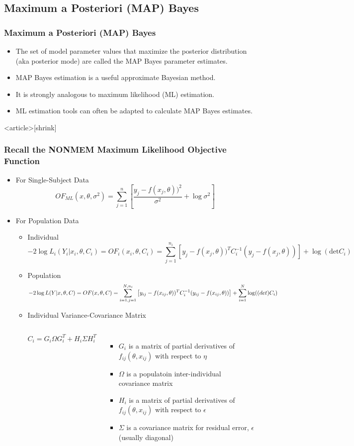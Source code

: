 \documentclass[handout]{beamer}
\begin{document}
\subsection{Maximum a Posteriori (MAP) Bayes}

\begin{frame}
  \frametitle{Maximum a Posteriori (MAP) Bayes}

  \begin{itemize}
  \item The set of model parameter values that maximize the posterior
    distribution (aka posterior mode) are called the MAP Bayes
    parameter estimates.
  \item MAP Bayes estimation is a useful approximate Bayesian method.
  \item It is strongly analogous to maximum likelihood (ML)
    estimation.
  \item ML estimation tools can often be adapted to calculate MAP
    Bayes estimates.
  \end{itemize}

\end{frame}

\begin{frame}<article>[shrink]
  \frametitle{\large Recall the NONMEM Maximum Likelihood Objective Function}

  \begin{itemize}
  \item For Single-Subject Data
$$OF_{ML}(x,\theta,\sigma^2) = \sum_{j=1}^{n}\left[\frac{y_j - f(x_j,\theta))^2}{\sigma^2} + \log\sigma^2\right]$$
\item For Population Data
  \begin{itemize}
  \item Individual
$$ -2\log L_i(Y_i|x_i,\theta,C_i) = OF_i(x_i,\theta,C_i) = \sum_{j=1}^{n_i}\left[y_j - f(x_j,\theta))^TC_i^{-1}(y_j-f(x_j,\theta))\right]+\log(\text{det}C_i)$$
\item Population
$$ -2\log L(Y|x,\theta,C) = OF(x,\theta,C) = \sum_{i=1,j=1}^{N,n_i}\left[y_{ij}-f(x_{ij},\theta))^TC_i^{-1}(y_{ij}-f(x_{ij},\theta))\right] + \sum_{i=1}^N\log(\text(det)C_i) $$
\item Individual Variance-Covariance Matrix
\begin{columns}
$$ C_i = G_i\Omega G_i^T + H_i\Sigma H_i^T$$
\begin{itemize}
\item $G_i$ is a matrix of partial derivatives of
  $f_{ij}(\theta,x_{ij})$ with respect to $\eta$
\item $\Omega$ is a populatoin inter-individual covariance matrix
\item $H_i$ is a matrix of partial derivatives of
  $f_{ij}(\theta, x_{ij})$ with respect to $\epsilon$
\item $\Sigma$ is a covariance matrix for residual error, $\epsilon$
  (usually diagonal)
\end{itemize}
\end{columns}
\end{itemize}
\end{itemize}

\end{frame}
\end{document}
